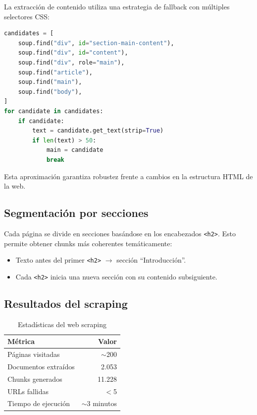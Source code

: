 \documentclass[12pt, a4paper, twoside]{report}
\begin{document}
La extracci\'on de contenido utiliza una estrategia de fallback con m\'ultiples selectores CSS:

\begin{lstlisting}[language=Python, caption={Selecci\'on del contenido principal}, label={lst:selectors}]
candidates = [
    soup.find("div", id="section-main-content"),
    soup.find("div", id="content"),
    soup.find("div", role="main"),
    soup.find("article"),
    soup.find("main"),
    soup.find("body"),
]
for candidate in candidates:
    if candidate:
        text = candidate.get_text(strip=True)
        if len(text) > 50:
            main = candidate
            break
\end{lstlisting}

Esta aproximaci\'on garantiza robustez frente a cambios en la estructura HTML de la web.

\subsection{Segmentaci\'on por secciones}

Cada p\'agina se divide en secciones bas\'andose en los encabezados \texttt{<h2>}. Esto permite obtener chunks m\'as coherentes tem\'aticamente:

\begin{itemize}
  \item Texto antes del primer \texttt{<h2>} $\rightarrow$ secci\'on ``Introducci\'on''.
  \item Cada \texttt{<h2>} inicia una nueva secci\'on con su contenido subsiguiente.
\end{itemize}

\subsection{Resultados del scraping}

\begin{table}[H]
\centering
\caption{Estad\'isticas del web scraping}
\label{tab:scraping-stats}
\begin{tabular}{lr}
\toprule
\textbf{M\'etrica} & \textbf{Valor} \\
\midrule
P\'aginas visitadas & $\sim$200 \\
Documentos extra\'idos & 2.053 \\
Chunks generados & 11.228 \\
URLs fallidas & $<$5 \\
Tiempo de ejecuci\'on & $\sim$3 minutos \\
\bottomrule
\end{tabular}
\end{table}
\end{document}
